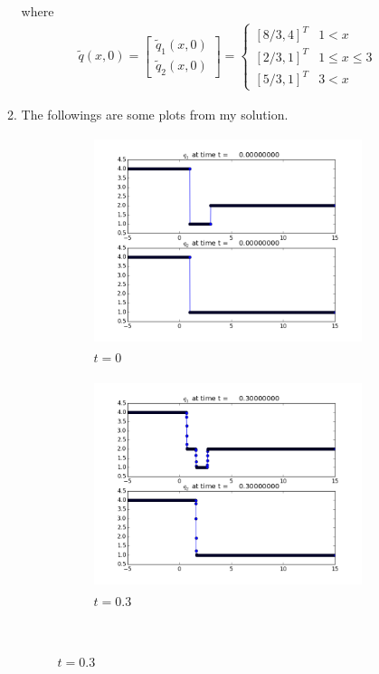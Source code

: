 \documentclass[11pt]{article}
\begin{document}
\begin{enumerate}
\begin{enumerate}
        		where 
        		\begin{align*}
        		\tilde{q}(x,0)=\begin{bmatrix}\tilde{q}_1(x,0)\\ \tilde{q}_2(x,0)\end{bmatrix}=
        		\begin{cases}
        		[8/3,4]^T & 1<x\\
        		[2/3,1]^T &1\leq x\leq 3\\
        		[5/3,1]^T & 3<x
        		\end{cases}
        		\end{align*}
        	\item
        		The followings are some plots from my solution.
        		\begin{figure}[H]
						\centering
						\begin{subfigure}{.5\textwidth}
  							\centering
  							\includegraphics[width=1\linewidth,height=2.4in]{frame0000fig1.png}
  							\caption{$t=0$}
  							\label{fig:sub1}
						\end{subfigure}%
						\begin{subfigure}{.5\textwidth}
  							\centering
  							\includegraphics[width=1\linewidth,height=2.4in]{frame0003fig1.png}
  							\caption{$t=0.3$}
  							\label{fig:sub2}
						\end{subfigure}\\
					

\end{figure}
\end{enumerate}
\end{enumerate}
\end{document}

